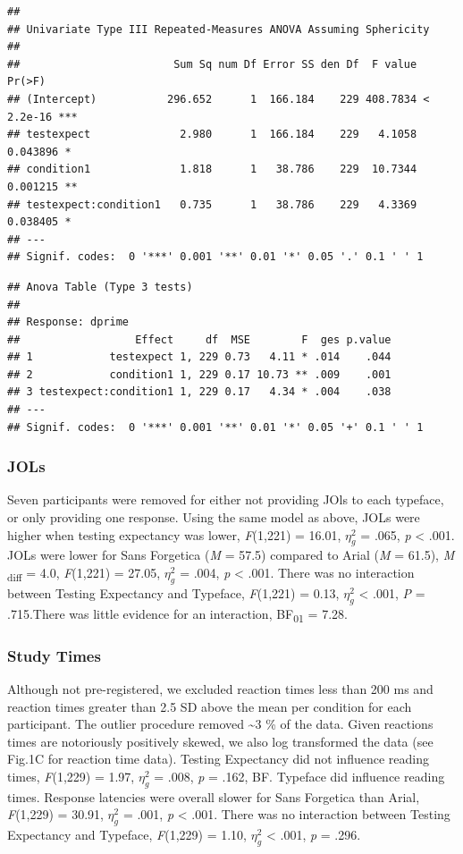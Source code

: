 \documentclass[
  english,
  man]{apa6}
\begin{document}
\begin{verbatim}
## 
## Univariate Type III Repeated-Measures ANOVA Assuming Sphericity
## 
##                        Sum Sq num Df Error SS den Df  F value    Pr(>F)    
## (Intercept)           296.652      1  166.184    229 408.7834 < 2.2e-16 ***
## testexpect              2.980      1  166.184    229   4.1058  0.043896 *  
## condition1              1.818      1   38.786    229  10.7344  0.001215 ** 
## testexpect:condition1   0.735      1   38.786    229   4.3369  0.038405 *  
## ---
## Signif. codes:  0 '***' 0.001 '**' 0.01 '*' 0.05 '.' 0.1 ' ' 1
\end{verbatim}

\begin{verbatim}
## Anova Table (Type 3 tests)
## 
## Response: dprime
##                  Effect     df  MSE        F  ges p.value
## 1            testexpect 1, 229 0.73   4.11 * .014    .044
## 2            condition1 1, 229 0.17 10.73 ** .009    .001
## 3 testexpect:condition1 1, 229 0.17   4.34 * .004    .038
## ---
## Signif. codes:  0 '***' 0.001 '**' 0.01 '*' 0.05 '+' 0.1 ' ' 1
\end{verbatim}

\hypertarget{jols}{%
\subsubsection{JOLs}\label{jols}}

Seven participants were removed for either not providing JOls to each typeface, or only providing one response. Using the same model as above, JOLs were higher when testing expectancy was lower, \emph{F}(1,221) = 16.01, \(\eta_{g}^{2}\) = .065, \emph{p} \textless{} .001. JOLs were lower for Sans Forgetica (\emph{M} = 57.5) compared to Arial (\emph{M} = 61.5), \emph{M} \textsubscript{diff} = 4.0, \emph{F}(1,221) = 27.05, \(\eta_{g}^{2}\) = .004, \emph{p} \textless{} .001. There was no interaction between Testing Expectancy and Typeface, \emph{F}(1,221) = 0.13, \(\eta_{g}^{2}\) \textless{} .001, \emph{P} = .715.There was little evidence for an interaction, BF\textsubscript{01} = 7.28.

\hypertarget{study-times}{%
\subsubsection{Study Times}\label{study-times}}

Although not pre-registered, we excluded reaction times less than 200 ms and reaction times greater than 2.5 SD above the mean per condition for each participant. The outlier procedure removed \textasciitilde3 \% of the data. Given reactions times are notoriously positively skewed, we also log transformed the data (see Fig.1C for reaction time data). Testing Expectancy did not influence reading times, \emph{F}(1,229) = 1.97, \(\eta_{g}^{2}\) = .008, \emph{p} = .162, BF. Typeface did influence reading times. Response latencies were overall slower for Sans Forgetica than Arial, \emph{F}(1,229) = 30.91, \(\eta_{g}^{2}\) = .001, \emph{p} \textless{} .001. There was no interaction between Testing Expectancy and Typeface, \emph{F}(1,229) = 1.10, \(\eta_{g}^{2}\) \textless{} .001, \emph{p} = .296.
\end{document}
